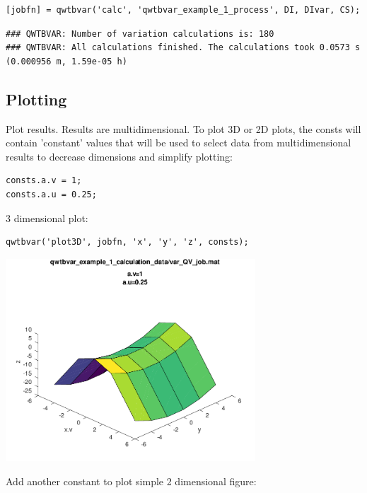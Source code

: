 \begin{lstlisting}
[jobfn] = qwtbvar('calc', 'qwtbvar_example_1_process', DI, DIvar, CS);
\end{lstlisting}
\begin{lstlisting}[language={},xleftmargin=5pt,frame=none]
### QWTBVAR: Number of variation calculations is: 180
### QWTBVAR: All calculations finished. The calculations took 0.0573 s (0.000956 m, 1.59e-05 h)

\end{lstlisting}


{}
\subsection*{Plotting}



Plot results. Results are multidimensional. To plot 3D or 2D plots, the consts
will contain 'constant' values that will be used to select data from
multidimensional results to decrease dimensions and simplify plotting:

\begin{lstlisting}
consts.a.v = 1;
consts.a.u = 0.25;
\end{lstlisting}


3 dimensional plot:

\begin{lstlisting}
qwtbvar('plot3D', jobfn, 'x', 'y', 'z', consts);
\end{lstlisting}
\begin{center}
\includegraphics[width=0.7\textwidth]{qwtb_examples_published/qwtbvar_example_1-1.pdf}
\end{center}


Add another constant to plot simple 2 dimensional figure:

